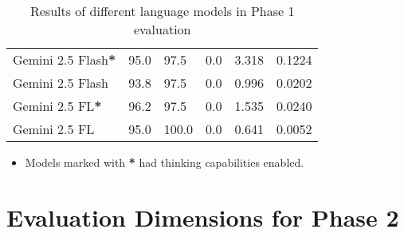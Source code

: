 \begin{table}[H]
\begin{tabularx}{\textwidth}{Xp{2.5cm}p{2.2cm}p{1.5cm}p{1.8cm}p{2cm}}
        \rowcolor[gray]{0.9}
        Gemini 2.5 Flash\textbf{*}  & 95.0                                  & 97.5                                  & 0.0                        & 3.318                         & 0.1224                           \\
        Gemini 2.5 Flash            & 93.8                                  & 97.5                                  & 0.0                        & 0.996                         & 0.0202                           \\
        \rowcolor[gray]{0.9}
        Gemini 2.5 FL\textbf{*}     & 96.2                                  & 97.5                                  & 0.0                        & 1.535                         & 0.0240                           \\
        Gemini 2.5 FL               & 95.0                                  & 100.0                                 & 0.0                        & 0.641                         & 0.0052                           \\
        \bottomrule
    \end{tabularx}

    \begin{itemize}
        \footnotesize
        \item Models marked with \textbf{*} had thinking capabilities enabled.
    \end{itemize}
    \caption{Results of different language models in Phase 1 evaluation}
    \label{tab:phase1_results}
\end{table}

\section{Evaluation Dimensions for Phase 2}

